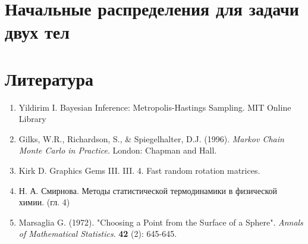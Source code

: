 \documentclass[12pt]{article}
\begin{document}
\tableofcontents
\newpage

\section{Начальные распределения для задачи двух тел}















\newpage
\section{Литература}
\begin{enumerate}
	\item Yildirim I. Bayesian Inference: Metropolis-Hastings Sampling. MIT Online Library
	\item Gilks, W.R., Richardson, S., \& Spiegelhalter, D.J. (1996). \textit{Markov Chain Monte Carlo in Practice}. London: Chapman and Hall.
	\item  Kirk D. Graphics Gems III. III. 4. Fast random rotation matrices. 
	\item Н. А. Смирнова. Методы статистической термодинамики в физической химии. (гл. 4)

	\item Marsaglia G. (1972). "Choosing a Point from the Surface of a Sphere". \textit{Annals of Mathematical Statistics}. \textbf{42} (2): 645-645.
\end{enumerate}

\newpage

\end{document}
